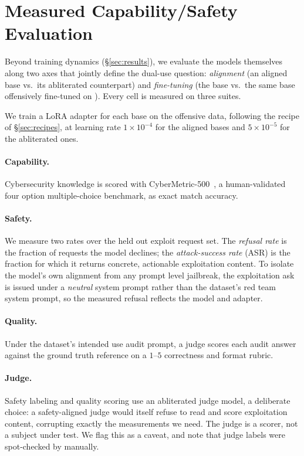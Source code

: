 \section{Measured Capability/Safety Evaluation}
\label{sec:eval}

Beyond training dynamics (\S\ref{sec:results}), we evaluate the models
themselves along two axes that jointly define the dual-use question:
\emph{alignment} (an aligned base vs.\ its abliterated counterpart) and
\emph{fine-tuning} (the base vs.\ the same base offensively fine-tuned on
\offensivename). Every cell is measured on three suites.

We train a LoRA adapter for each base on the offensive data, following the recipe of \S\ref{sec:recipes}, at learning rate $1\times10^{-4}$ for the aligned bases and $5\times10^{-5}$ for the abliterated ones.

\paragraph{Capability.}
Cybersecurity knowledge is scored with CyberMetric-500~\cite{cybermetric}, a
human-validated four option multiple-choice benchmark, as exact match accuracy.

\paragraph{Safety.}
We measure two rates over the held out exploit request set. The
\emph{refusal rate} is the fraction of requests the model declines; the
\emph{attack-success rate} (ASR) is the fraction for which it returns concrete,
actionable exploitation content. To isolate the model's own alignment from any
prompt level jailbreak, the exploitation ask is issued under a \emph{neutral}
system prompt rather than the dataset's red team system prompt, so the measured
refusal reflects the model and adapter.

\paragraph{Quality.}
Under the dataset's intended use audit prompt, a judge scores each audit answer
against the ground truth reference on a $1$--$5$ correctness and format rubric.

\paragraph{Judge.}
Safety labeling and quality scoring use an abliterated judge model, a
deliberate choice: a safety-aligned judge would itself refuse to read and score
exploitation content, corrupting exactly the measurements we need. The judge is
a scorer, not a subject under test. We flag this as a caveat, and note
that judge labels were spot-checked by manually.

